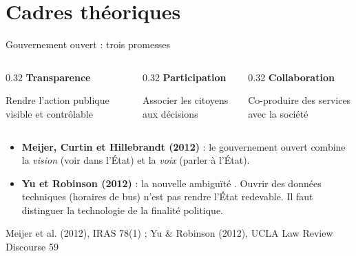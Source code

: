 \documentclass[11pt,aspectratio=169]{beamer}
\newcommand{\refc}[1]{\textcolor{gris}{\footnotesize #1}}
\begin{document}
\section{Cadres théoriques}

\begin{frame}{Gouvernement ouvert : trois promesses}
  \begin{columns}[T]
    \begin{column}{0.32\textwidth}
      \textbf{\color{bleu}Transparence}\par\smallskip
      \small Rendre l'action publique visible et contrôlable
    \end{column}
    \begin{column}{0.32\textwidth}
      \textbf{\color{bleu}Participation}\par\smallskip
      \small Associer les citoyens aux décisions
    \end{column}
    \begin{column}{0.32\textwidth}
      \textbf{\color{bleu}Collaboration}\par\smallskip
      \small Co-produire des services avec la société
    \end{column}
  \end{columns}
  \vspace{1em}
  \begin{itemize}
    \item \textbf{Meijer, Curtin et Hillebrandt (2012)} : le gouvernement ouvert combine la \emph{vision} (voir dans l'État) et la \emph{voix} (parler à l'État).
    \item \textbf{Yu et Robinson (2012)} : \og la nouvelle ambiguïté \fg{}. Ouvrir des données techniques (horaires de bus) n'est pas rendre l'État redevable. Il faut distinguer la technologie de la finalité politique.
  \end{itemize}
  \vfill
  \refc{Meijer et al. (2012), IRAS 78(1) ; Yu \& Robinson (2012), UCLA Law Review Discourse 59}
\end{frame}
\end{document}
